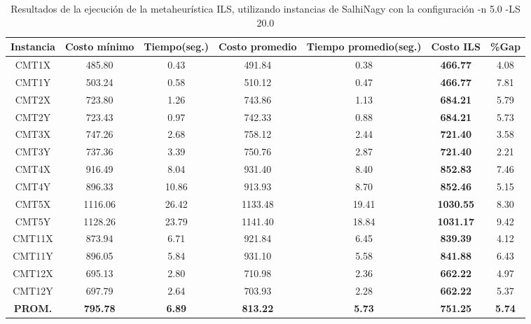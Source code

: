 \begin{table}[ht]
\caption{Resultados de la ejecución de la metaheurística ILS, utilizando instancias de SalhiNagy con la configuración -n 5.0 -LS 20.0}
\centering
\small
\begin{tabular}{c c c c c c c}
\hline\hline
Instancia & Costo mínimo & Tiempo(seg.) & Costo promedio & Tiempo promedio(seg.) & Costo ILS & \%Gap \\ [0.5ex]
\hline
CMT1X & 485.80 & 0.43 & 
491.84 & 0.38 & \bf{466.77} & 
4.08\\CMT1Y & 503.24 & 0.58 & 
510.12 & 0.47 & \bf{466.77} & 
7.81\\CMT2X & 723.80 & 1.26 & 
743.86 & 1.13 & \bf{684.21} & 
5.79\\CMT2Y & 723.43 & 0.97 & 
742.33 & 0.88 & \bf{684.21} & 
5.73\\CMT3X & 747.26 & 2.68 & 
758.12 & 2.44 & \bf{721.40} & 
3.58\\CMT3Y & 737.36 & 3.39 & 
750.76 & 2.87 & \bf{721.40} & 
2.21\\CMT4X & 916.49 & 8.04 & 
931.40 & 8.40 & \bf{852.83} & 
7.46\\CMT4Y & 896.33 & 10.86 & 
913.93 & 8.70 & \bf{852.46} & 
5.15\\CMT5X & 1116.06 & 26.42 & 
1133.48 & 19.41 & \bf{1030.55} & 
8.30\\CMT5Y & 1128.26 & 23.79 & 
1141.40 & 18.84 & \bf{1031.17} & 
9.42\\CMT11X & 873.94 & 6.71 & 
921.84 & 6.45 & \bf{839.39} & 
4.12\\CMT11Y & 896.05 & 5.84 & 
931.10 & 5.58 & \bf{841.88} & 
6.43\\CMT12X & 695.13 & 2.80 & 
710.98 & 2.36 & \bf{662.22} & 
4.97\\CMT12Y & 697.79 & 2.64 & 
703.93 & 2.28 & \bf{662.22} & 
5.37\\\bf{PROM.} & 
\bf{795.78} & \bf{6.89} & \bf{813.22} & \bf{5.73} & \bf{751.25} & \bf{5.74}\\[1ex]\hline
\end{tabular}
\label{table:nonlin}
\end{table} \clearpage
